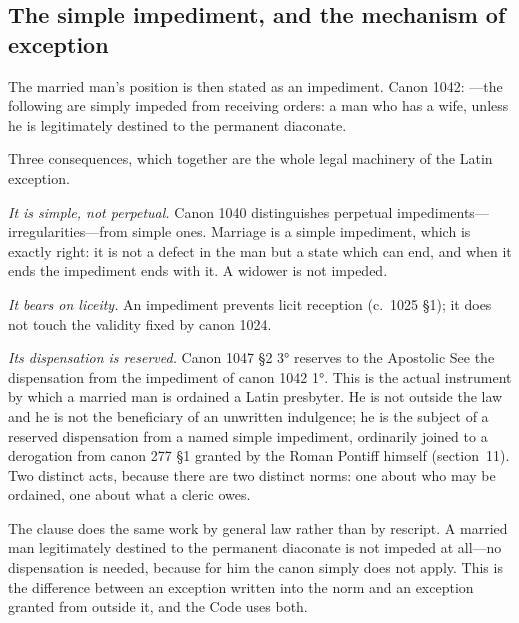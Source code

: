 \subsection{The simple impediment, and the mechanism of exception}

The married man's position is then stated as an impediment. Canon 1042: ---the following are simply impeded from receiving orders: a man who has a wife, unless he is legitimately destined to the permanent diaconate.

Three consequences, which together are the whole legal machinery of the Latin exception.

\emph{It is simple, not perpetual.} Canon 1040 distinguishes perpetual impediments---irregularities---from simple ones. Marriage is a simple impediment, which is exactly right: it is not a defect in the man but a state which can end, and when it ends the impediment ends with it. A widower is not impeded.

\emph{It bears on liceity.} An impediment prevents licit reception (c.~1025 §1); it does not touch the validity fixed by canon 1024.

\emph{Its dispensation is reserved.} Canon 1047 §2 3° reserves to the Apostolic See the dispensation from the impediment of canon 1042 1°. This is the actual instrument by which a married man is ordained a Latin presbyter. He is not outside the law and he is not the beneficiary of an unwritten indulgence; he is the subject of a reserved dispensation from a named simple impediment, ordinarily joined to a derogation from canon 277 §1 granted by the Roman Pontiff himself (section~11). Two distinct acts, because there are two distinct norms: one about who may be ordained, one about what a cleric owes.

The clause  does the same work by general law rather than by rescript. A married man legitimately destined to the permanent diaconate is not impeded at all---no dispensation is needed, because for him the canon simply does not apply. This is the difference between an exception written into the norm and an exception granted from outside it, and the Code uses both.
